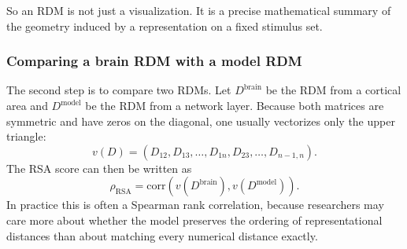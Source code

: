 So an RDM is not just a visualization. It is a precise mathematical summary of the geometry induced by a representation on a fixed stimulus set.

\subsubsection{Comparing a brain RDM with a model RDM}

The second step is to compare two RDMs. Let \(D^{\mathrm{brain}}\) be the RDM from a cortical area and \(D^{\mathrm{model}}\) be the RDM from a network layer. Because both matrices are symmetric and have zeros on the diagonal, one usually vectorizes only the upper triangle:
\[
v(D) = (D_{12},D_{13},\ldots,D_{1n},D_{23},\ldots,D_{n-1,n}).
\]
The RSA score can then be written as
\[
\rho_{\mathrm{RSA}}
= \mathrm{corr}\!\left(v(D^{\mathrm{brain}}),v(D^{\mathrm{model}})\right).
\]
In practice this is often a Spearman rank correlation, because researchers may care more about whether the model preserves the ordering of representational distances than about matching every numerical distance exactly.

